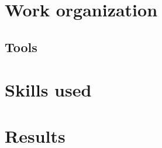 \documentclass[10pt,a4paper]{article}
\begin{document}
\section{Work organization}
\subsection{Tools}


\section{Skills used}

\section{Results}
\end{document}

